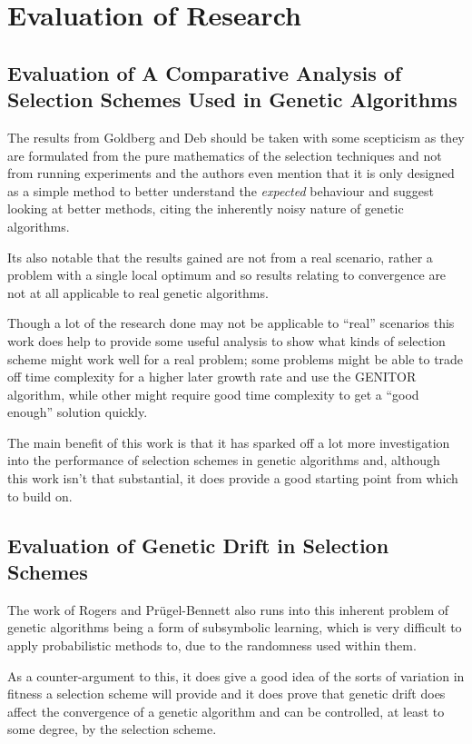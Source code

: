 \documentclass[10pt, a4paper]{article}
\begin{document}
\newpage
\section{Evaluation of Research}

\subsection{Evaluation of A Comparative Analysis of Selection Schemes Used in Genetic Algorithms} 
The results from Goldberg and Deb\cite{Goldberg1991Comparative} should be taken
with some scepticism as they are formulated from the pure mathematics of the 
selection techniques and not from running experiments and the authors even 
mention that it is only designed as a simple method to better understand the 
\textit{expected} behaviour and suggest looking at better methods, citing the 
inherently noisy nature of genetic algorithms.

Its also notable that the results gained are not from a real scenario, rather a
problem with a single local optimum and so results relating to convergence are
not at all applicable to real genetic algorithms.

Though a lot of the research done may not be applicable to ``real'' scenarios
this work does help to provide some useful analysis to show what kinds of
selection scheme might work well for a real problem; some problems might be able
to trade off time complexity for a higher later growth rate and use the GENITOR
algorithm, while other might require good time complexity to get a ``good
enough'' solution quickly.

The main benefit of this work is that it has sparked off a lot more
investigation into the performance of selection schemes in genetic algorithms
and, although this work isn't that substantial, it does provide a good starting
point from which to build on.



\subsection{Evaluation of Genetic Drift in Selection Schemes} 
The work of Rogers and Pr\"{u}gel-Bennett\cite{Rogers1999Genetic} also runs 
into this inherent problem of genetic algorithms being a form of subsymbolic 
learning, which is very difficult to apply probabilistic methods to, due to the
randomness used within them.

As a counter-argument to this, it does give a good idea of the sorts of
variation in fitness a selection scheme will provide and it does prove that
genetic drift does affect the convergence of a genetic algorithm and can be
controlled, at least to some degree, by the selection scheme.
\end{document}
